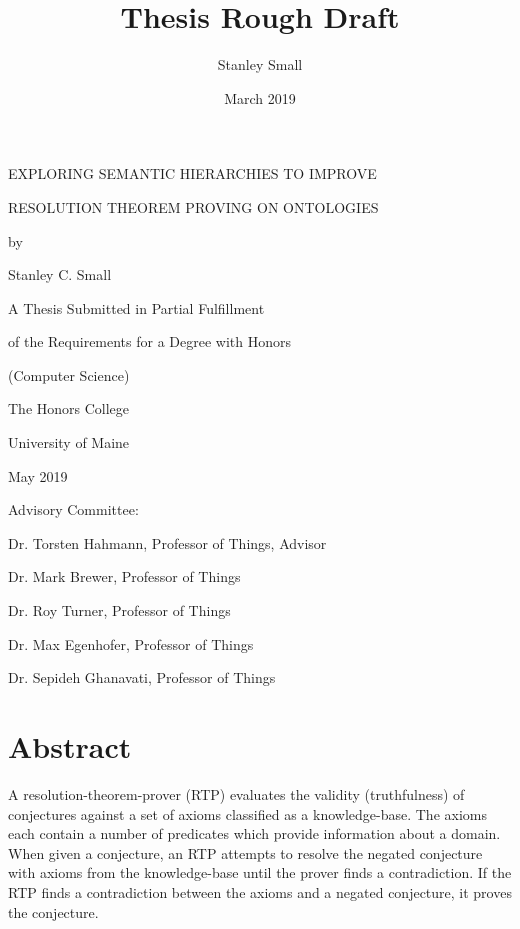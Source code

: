 \documentclass{article}
\title{Thesis Rough Draft}
\author{Stanley Small}
\date{March 2019}
\begin{document}
\begin{titlepage}
    \begin{center}
        \MakeUppercase{Exploring Semantic Hierarchies to Improve}
        
        \MakeUppercase{Resolution Theorem Proving on Ontologies}
        
        \vspace{0.5cm}
        by
        
        \vspace{0.5cm}
        Stanley C. Small
        
        
        \vspace{4cm}
        A Thesis Submitted in Partial Fulfillment
        
        of the Requirements for a Degree with Honors
        
        (Computer Science)
        
        \vspace{3cm}
        
        The Honors College
        
        University of Maine

        May 2019
    \end{center}
    
    Advisory Committee:
    
    \hspace{10mm} Dr. Torsten Hahmann, Professor of Things, Advisor
    
    \hspace{10mm} Dr. Mark Brewer, Professor of Things
    
    \hspace{10mm} Dr. Roy Turner, Professor of Things
    
    \hspace{10mm} Dr. Max Egenhofer, Professor of Things
    
    \hspace{10mm} Dr. Sepideh Ghanavati, Professor of Things
    
    
\end{titlepage}

\tableofcontents

\newpage
\section{Abstract}
A resolution-theorem-prover (RTP) evaluates the validity (truthfulness) of conjectures against a set of axioms classified as a knowledge-base. The axioms each contain a number of predicates which provide information about a domain. When given a conjecture, an RTP attempts to resolve the negated conjecture with axioms from the knowledge-base until the prover finds a contradiction. If the RTP finds a contradiction between the axioms and a negated conjecture, it proves the conjecture. 
\end{document}
